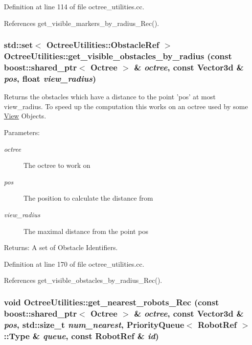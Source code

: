 Definition at line 114 of file octree\_\-utilities.cc.

References get\_\-visible\_\-markers\_\-by\_\-radius\_\-Rec().\hypertarget{class_octree_utilities_18b26e822f6ebec9c655a65cfb12768b}{
\subsubsection[get\_\-visible\_\-obstacles\_\-by\_\-radius]{\setlength{\rightskip}{0pt plus 5cm}std::set$<$ OctreeUtilities::ObstacleRef $>$ OctreeUtilities::get\_\-visible\_\-obstacles\_\-by\_\-radius (const boost::shared\_\-ptr$<$ {\bf Octree} $>$ \& {\em octree}, \/  const Vector3d \& {\em pos}, \/  float {\em view\_\-radius})}}
\label{class_octree_utilities_18b26e822f6ebec9c655a65cfb12768b}


Returns the obstacles which have a distance to the point 'pos' at most view\_\-radius. To speed up the computation this works on an octree used by some \hyperlink{class_view}{View} Objects.

\begin{Desc}
\item[Parameters:]
\begin{description}
\item[{\em octree}]The octree to work on \item[{\em pos}]The position to calculate the distance from \item[{\em view\_\-radius}]The maximal distance from the point pos\end{description}
\end{Desc}
\begin{Desc}
\item[Returns:]A set of Obstacle Identifiers. \end{Desc}


Definition at line 170 of file octree\_\-utilities.cc.

References get\_\-visible\_\-obstacles\_\-by\_\-radius\_\-Rec().\hypertarget{class_octree_utilities_082a4c0a6384ee0a467378f5e6552d9a}{
\subsubsection[get\_\-nearest\_\-robots\_\-Rec]{\setlength{\rightskip}{0pt plus 5cm}void OctreeUtilities::get\_\-nearest\_\-robots\_\-Rec (const boost::shared\_\-ptr$<$ {\bf Octree} $>$ \& {\em octree}, \/  const Vector3d \& {\em pos}, \/  std::size\_\-t {\em num\_\-nearest}, \/  PriorityQueue$<$ RobotRef $>$::Type \& {\em queue}, \/  const RobotRef \& {\em id})}}
\label{class_octree_utilities_082a4c0a6384ee0a467378f5e6552d9a}


